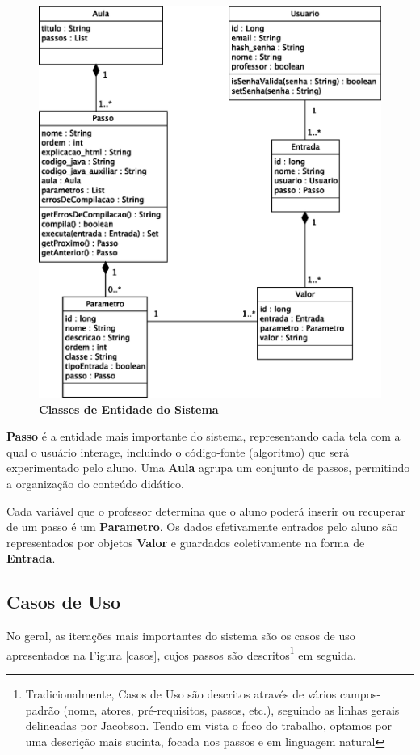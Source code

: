 \documentclass{abnt}
\begin{document}
\begin{figure}
\begin{center}
\includegraphics[scale=0.8]{classes.eps}
\caption{{\bf Classes de Entidade do Sistema}}
\label{classes}
\end{center}
\end{figure}

\textbf{Passo} é a entidade mais importante do sistema, representando cada tela com a qual o usuário interage, incluindo o código-fonte (algoritmo) que será experimentado pelo aluno. Uma \textbf{Aula} agrupa um conjunto de passos, permitindo a organização do conteúdo didático.

Cada variável que o professor determina que o aluno poderá inserir ou recuperar de um passo é um \textbf{Parametro}. Os dados efetivamente entrados pelo aluno são representados por objetos \textbf{Valor} e guardados coletivamente na forma de \textbf{Entrada}.

\subsection{Casos de Uso}

No geral, as iterações mais importantes do sistema são os casos de uso apresentados na Figura \ref{casos}, cujos passos são descritos\footnote{Tradicionalmente, Casos de Uso são descritos através de vários campos-padrão (nome, atores, pré-requisitos, passos, etc.), seguindo as linhas gerais delineadas por Jacobson\cite{Jacobson}. Tendo em vista o foco do trabalho, optamos por uma descrição mais sucinta, focada nos passos e em linguagem natural} em seguida.
\end{document}
